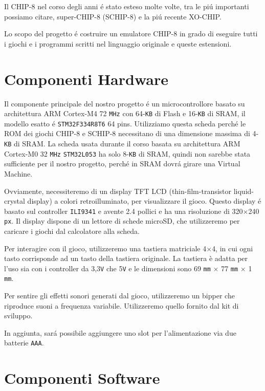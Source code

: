 \documentclass[a4paper]{article}
\begin{document}
Il CHIP-8 nel corso degli anni é stato esteso molte volte, tra le piú importanti possiamo citare, super-CHIP-8 (SCHIP-8) e la piú recente XO-CHIP.  

Lo scopo del progetto é costruire un emulatore CHIP-8 in grado di eseguire tutti i giochi e i programmi scritti nel linguaggio originale e queste estensioni. 


\section{Componenti Hardware}

Il componente principale del nostro progetto é un microcontrollore basato su architettura ARM Cortex-M4 72 \texttt{MHz} con 64-\texttt{KB} di Flash e 16-\texttt{KB} di SRAM, il  modello esatto é \texttt{STM32F334R8T6} 64 pins. Utilizziamo questa scheda perché le ROM dei giochi CHIP-8 e SCHIP-8 necessitano di una dimensione massima di 4-\texttt{KB} di SRAM. La scheda usata durante il corso basata su architettura ARM Cortex-M0 32 \texttt{MHz} \texttt{STM32L053} ha solo 8-\texttt{KB} di SRAM, quindi non sarebbe stata sufficiente per il nostro progetto, perché in SRAM dovrá girare una Virtual Machine. 

Ovviamente, necessiteremo di un display TFT LCD (thin-film-transistor liquid-crystal display) a colori retroilluminato, per visualizzare il gioco. Questo display é basato sul controller \texttt{ILI9341} e avente 2.4 pollici e ha una risoluzione di 320$\times$240 \texttt{px}. Il display dispone di un lettore di schede microSD, che utilizzeremo per caricare i giochi dal calcolatore alla scheda.

Per interagire con il gioco, utilizzeremo una tastiera matriciale 4$\times$4, in cui ogni tasto corrisponde ad un tasto della tastiera originale. La tastiera è adatta per l'uso sia con i controller da 3,3\texttt{V} che 5\texttt{V} e le dimensioni sono 69 \texttt{mm} $\times$ 77 \texttt{mm} $\times$ 1 \texttt{mm}.  

Per sentire gli effetti sonori generati dal gioco, utilizzeremo un bipper che riproduce suoni a frequenza variabile. Utilizzeremo quello fornito dal kit di sviluppo.

In aggiunta, sará possibile aggiungere uno slot per l'alimentazione via due batterie \texttt{AAA}.

\section{Componenti Software}
\end{document}
